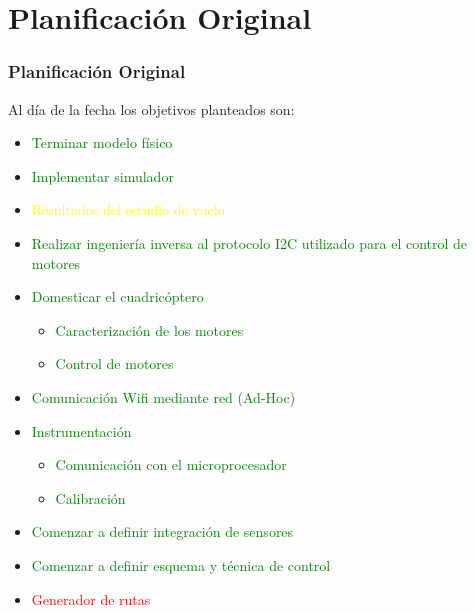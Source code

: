 \documentclass[slidestop,compress,mathserif,xcolor=svgnames,table]{beamer}
\begin{document}
\section{Planificaci\'on Original}
\begin{frame}
\frametitle{Planificaci\'on Original}

Al d\'ia de la fecha los objetivos planteados son:\pause

\begin{itemize}
\item \textcolor{green}{Terminar modelo f\'isico}\pause
\item \textcolor{green}{Implementar simulador}\pause
\item \textcolor{yellow}{Resultados del estudio de vuelo}
\item \textcolor{green}{Realizar ingenier\'ia inversa al protocolo I2C utilizado para el control de motores} \pause
\item \textcolor{green}{Domesticar el cuadric\'optero}\pause
	\begin{itemize}
	\item \textcolor{green}{Caracterizaci\'on de los motores}\pause
	\item \textcolor{green}{Control de motores}\pause
	\end{itemize}
\item \textcolor{green}{Comunicaci\'on Wifi mediante red (Ad-Hoc)}\pause
\item \textcolor{green}{Instrumentaci\'on}
	\begin{itemize}
		\item \textcolor{green}{Comunicaci\'on con el microprocesador}
		\item \textcolor{green}{Calibraci\'on}\pause
	\end{itemize}
\item \textcolor{green}{Comenzar a definir integraci\'on de sensores}\pause
\item \textcolor{green}{Comenzar a definir esquema y t\'ecnica de control}
\item \textcolor{red}{Generador de rutas}
\end{itemize}

\end{frame}
\end{document}
